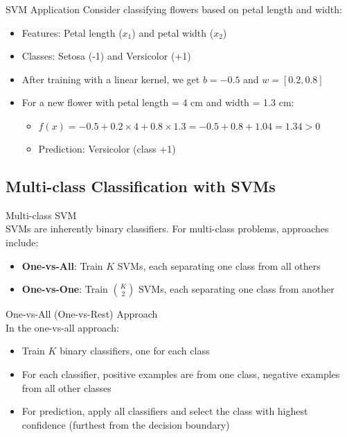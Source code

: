 \begin{example}{SVM Application}
Consider classifying flowers based on petal length and width:
\begin{itemize}
    \item Features: Petal length ($x_1$) and petal width ($x_2$)
    \item Classes: Setosa (-1) and Versicolor (+1)
    \item After training with a linear kernel, we get $b = -0.5$ and $w = [0.2, 0.8]$
    \item For a new flower with petal length = 4 cm and width = 1.3 cm:
    \begin{itemize}
        \item $f(x) = -0.5 + 0.2 \times 4 + 0.8 \times 1.3 = -0.5 + 0.8 + 1.04 = 1.34 > 0$
        \item Prediction: Versicolor (class +1)
    \end{itemize}
\end{itemize}
\end{example}

\subsection{Multi-class Classification with SVMs}

\begin{concept}{Multi-class SVM}\\
SVMs are inherently binary classifiers. For multi-class problems, approaches include:
\begin{itemize}
    \item \textbf{One-vs-All}: Train $K$ SVMs, each separating one class from all others
    \item \textbf{One-vs-One}: Train $\binom{K}{2}$ SVMs, each separating one class from another
\end{itemize}
\end{concept}

\begin{definition}{One-vs-All (One-vs-Rest) Approach}\\
In the one-vs-all approach:
\begin{itemize}
    \item Train $K$ binary classifiers, one for each class
    \item For each classifier, positive examples are from one class, negative examples from all other classes
    \item For prediction, apply all classifiers and select the class with highest confidence (furthest from the decision boundary)
\end{itemize}
\end{definition}

